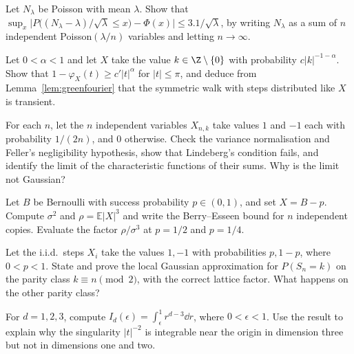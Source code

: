 \begin{exercise}[$\star\star$]\label{ex:poissonbe}
Let $N_\lambda$ be Poisson with mean $\lambda$. Show that $\sup_x\bigl|P\bigl((N_\lambda-\lambda)/\sqrt\lambda\le x\bigr)-\Phi(x)\bigr|\le3.1/\sqrt\lambda$, by
writing $N_\lambda$ as a sum of $n$ independent Poisson$(\lambda/n)$ variables and letting $n\to\infty$.
\end{exercise}

\begin{exercise}[$\star\star\star$]\label{ex:heavytail}
Let $0<\alpha<1$ and let $X$ take the value $k\in\Z\setminus\{0\}$ with probability $c|k|^{-1-\alpha}$. Show that $1-\varphi_X(t)\ge c'|t|^\alpha$ for
$|t|\le\pi$, and deduce from Lemma~\ref{lem:greenfourier} that the symmetric walk with steps distributed like $X$ is transient.
\end{exercise}

\begin{exercise}[$\star\star$]\label{ex:v11-ch04-rare-array}
For each $n$, let the $n$ independent variables $X_{n,k}$ take values $1$ and $-1$ each with probability $1/(2n)$, and $0$ otherwise. Check the variance normalisation and Feller's negligibility hypothesis, show that Lindeberg's condition fails, and identify the limit of the characteristic functions of their sums. Why is the limit not Gaussian?
\end{exercise}

\begin{exercise}[$\star$]\label{ex:v11-ch04-bernoulli-bound}
Let $B$ be Bernoulli with success probability $p\in(0,1)$, and set $X=B-p$. Compute $\sigma^2$ and $\rho=\mathbb E|X|^3$ and write the Berry--Esseen bound for $n$ independent copies. Evaluate the factor $\rho/\sigma^3$ at $p=1/2$ and $p=1/4$.
\end{exercise}

\begin{exercise}[$\star\star$]\label{ex:v11-ch04-span-two}
Let the i.i.d.\ steps $X_i$ take the values $1,-1$ with probabilities $p,1-p$, where $0<p<1$. State and prove the local Gaussian approximation for $P(S_n=k)$ on the parity class $k\equiv n\pmod2$, with the correct lattice factor. What happens on the other parity class?
\end{exercise}

\begin{exercise}[$\star\star$]\label{ex:v11-ch04-radial}
For $d=1,2,3$, compute $I_d(\epsilon)=\int_\epsilon^1 r^{d-3}\dd r$, where $0<\epsilon<1$. Use the result to explain why the singularity $|t|^{-2}$ is integrable near the origin in dimension three but not in dimensions one and two.
\end{exercise}

